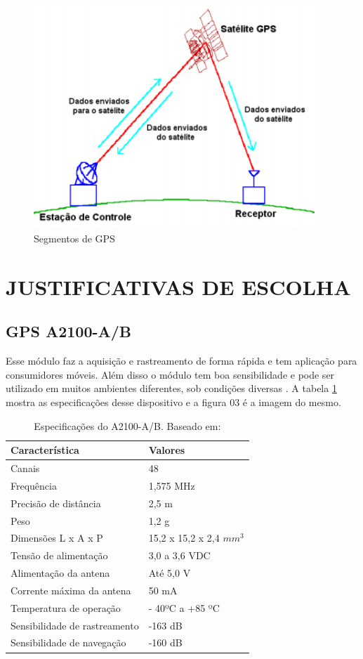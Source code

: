 \begin{figure}[h]
  \centering
  \includegraphics[width=400px, scale=1]{figuras/segmentos_gps}
  \caption{Segmentos de GPS  \cite{9gps}}
\label{fig:segmentos_gps}
\end{figure}


\section{JUSTIFICATIVAS DE ESCOLHA}
\subsection{GPS A2100-A/B}

Esse módulo faz a aquisição e rastreamento de forma rápida e tem aplicação
 para consumidores móveis. Além disso o módulo tem boa sensibilidade e pode
 ser utilizado em muitos ambientes diferentes, sob condições diversas \cite{10gps}.
 A tabela \ref{table:especificacao_gps23} mostra as especificações desse dispositivo e a figura 03 é a
 imagem do mesmo.


  \begin{table}[ht]
  \caption{Especificações do A2100-A/B. Baseado em: \cite{10gps}}
  \centering
  \begin{tabular}{| l |  p{10cm} |}
  \hline
  Característica & Valores \\
  \hline
  Canais & 48 \\
  \hline
  Frequência & 1,575 MHz \\
  \hline
  Precisão de distância & 2,5 m \\
  \hline
  Peso & 1,2 g \\
  \hline
  Dimensões L x A x P & 15,2 x 15,2 x 2,4 $ mm ^ {3} $ \\
  \hline
  Tensão de alimentação & 3,0 a 3,6 VDC \\
  \hline
  Alimentação da antena & Até 5,0 V \\
  \hline
  Corrente máxima da antena & 50 mA \\
  \hline
  Temperatura de operação & - 40ºC a +85 ºC \\
  \hline
  Sensibilidade de rastreamento & -163 dB \\
  \hline
  Sensibilidade de navegação & -160 dB \\
  \hline
  \end{tabular}
  \label{table:especificacao_gps23}
  \end{table}

